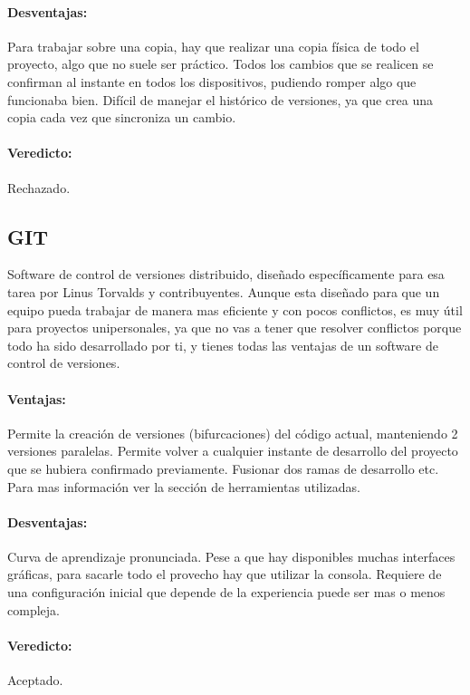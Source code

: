\paragraph{Desventajas:} Para trabajar sobre una copia, hay que realizar una copia f\'{i}sica de todo el proyecto, algo que no suele ser pr\'{a}ctico.
Todos los cambios que se realicen se confirman al instante en todos los dispositivos, pudiendo romper algo que funcionaba bien. Dif\'{i}cil de manejar
el hist\'{o}rico de versiones, ya que crea una copia cada vez que sincroniza un cambio.

\paragraph{Veredicto:} Rechazado.

\subsection{GIT}
Software de control de versiones distribuido, dise\~{n}ado espec\'{i}ficamente para esa tarea por Linus Torvalds y contribuyentes. Aunque esta dise\~{n}ado 
para que un equipo pueda trabajar de manera mas eficiente y con pocos conflictos, es muy \'{u}til para proyectos unipersonales, ya que no vas a tener que
resolver conflictos porque todo ha sido desarrollado por ti, y tienes todas las ventajas de un software de control de versiones.

\paragraph{Ventajas:} Permite la creaci\'{o}n de versiones (bifurcaciones) del c\'{o}digo actual, manteniendo 2 versiones paralelas. Permite volver a 
cualquier instante de desarrollo del proyecto que se hubiera confirmado previamente. Fusionar dos ramas de desarrollo etc. Para mas informaci\'{o}n ver la 
secci\'{o}n de herramientas utilizadas.

\paragraph{Desventajas:} Curva de aprendizaje pronunciada. Pese a que hay disponibles muchas interfaces gr\'{a}ficas, para sacarle todo el provecho hay
que utilizar la consola. Requiere de una configuraci\'{o}n inicial que depende de la experiencia puede ser mas o menos compleja.

\paragraph{Veredicto:} Aceptado.


